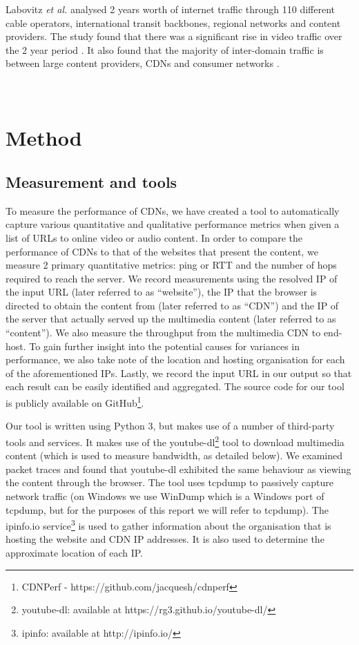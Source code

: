 \documentclass{sig-alternate-05-2015}
\begin{document}
Labovitz \textit{et al.} \cite{Labovitz:2010:IIT:2043164.1851194} analysed 2 years worth of internet traffic through 110 different cable operators, international transit backbones, regional networks and content providers. The study found that there was a significant rise in video traffic over the 2 year period \cite{Labovitz:2010:IIT:2043164.1851194}. It also found that the majority of inter-domain traffic is between large content providers, CDNs and consumer networks \cite{Labovitz:2010:IIT:2043164.1851194}.
\\\\\\
\section{Method}\label{sec:method}
\subsection{Measurement and tools}
To measure the performance of CDNs, we have created a tool to automatically capture various quantitative and qualitative performance metrics when given a list of URLs to online video or audio content. In order to compare the performance of CDNs to that of the websites that present the content, we measure 2 primary quantitative metrics: ping or RTT and the number of hops required to reach the server. We record measurements using the resolved IP of the input URL (later referred to as ``website''), the IP that the browser is directed to obtain the content from (later referred to as ``CDN'') and the IP of the server that actually served up the multimedia content (later referred to as ``content''). We also measure the throughput from the multimedia CDN to end-host. To gain further insight into the potential causes for variances in performance, we also take note of the location and hosting organisation for each of the aforementioned IPs. Lastly, we record the input URL in our output so that each result can be easily identified and aggregated. The source code for our tool is publicly available on GitHub\footnote{CDNPerf -  https://github.com/jacquesh/cdnperf}.

Our tool is written using Python 3, but makes use of a number of third-party tools and services. It makes use of the youtube-dl\footnote{youtube-dl: available at https://rg3.github.io/youtube-dl/} tool to download multimedia content (which is used to measure bandwidth, as detailed below). We examined packet traces and found that youtube-dl exhibited the same behaviour as viewing the content through the browser. The tool uses tcpdump to passively capture network traffic (on Windows we use WinDump which is a Windows port of tcpdump, but for the purposes of this report we will refer to tcpdump). The ipinfo.io service\footnote{ipinfo: available at http://ipinfo.io/} is used to gather information about the organisation that is hosting the website and CDN IP addresses. It is also used to determine the approximate location of each IP. 
\end{document}
